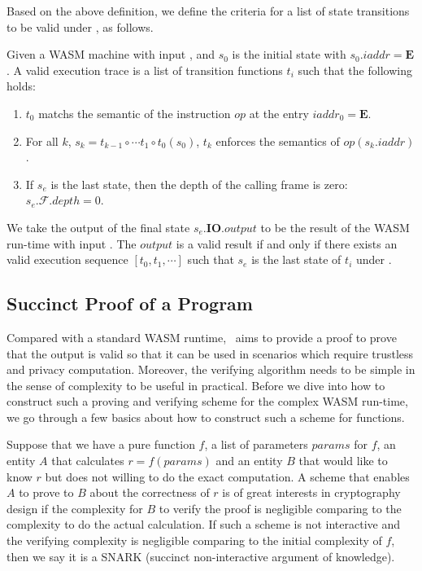 \smallskip Based on the above definition, we define the criteria for a list of state transitions to be valid under \initstate, as follows.

\begin{definition}
\label{def:valid-trace}
Given a WASM machine with input \initstate, and $s_0$ is the initial state with $s_0.iaddr = \mathbf{E}$. A valid execution trace is a list of transition functions $t_i$ such that the following holds:
\begin{enumerate}[leftmargin=*]
\item $t_0$ matchs the semantic of the instruction $op$ at the entry $iaddr_0 = \mathbf{E}$.
\item For all $k$, $s_k = t_{k-1} \circ \cdots t_1 \circ t_0 (s_0)$, $t_k$ enforces the semantics of $op(s_k.iaddr)$.
\item If $s_{e}$ is the last state, then the depth of the calling frame is zero: $s_e.\mathcal{F}.depth = 0$.
\end{enumerate}
\end{definition}

We take the output of the final state $s_e.\mathbf{IO}.output$ to be the result of the WASM run-time with input \initstate. The $output$ is a valid result if and only if there exists an valid execution sequence $\left[t_0, t_1, \cdots \right]$ such that $s_e$ is the last state of $t_i$ under \initstate.

 
\subsection{Succinct Proof of a Program}

Compared with a standard WASM runtime, \zkwasm\, aims to provide a proof to prove that the output is valid so that it can be used in scenarios which require trustless and privacy computation.  Moreover, the verifying algorithm needs to be simple in the sense of complexity to be useful in practical. Before we dive into how to construct such a proving and verifying scheme for the complex WASM run-time, we go through a few basics about how to construct such a scheme for functions.

Suppose that we have a pure function $f$, a list of parameters $params$ for $f$, an entity $A$ that calculates $r = f(params)$ and an entity $B$ that would like to know $r$ but does not willing to do the exact computation. A scheme that enables $A$ to prove to $B$ about the correctness of $r$ is of great interests in cryptography design if the complexity for $B$ to verify the proof is negligible comparing to the complexity to do the actual calculation. If such a scheme is not interactive and the verifying complexity is negligible comparing to the initial complexity of $f$, then we say it is a SNARK (succinct non-interactive argument of knowledge).

